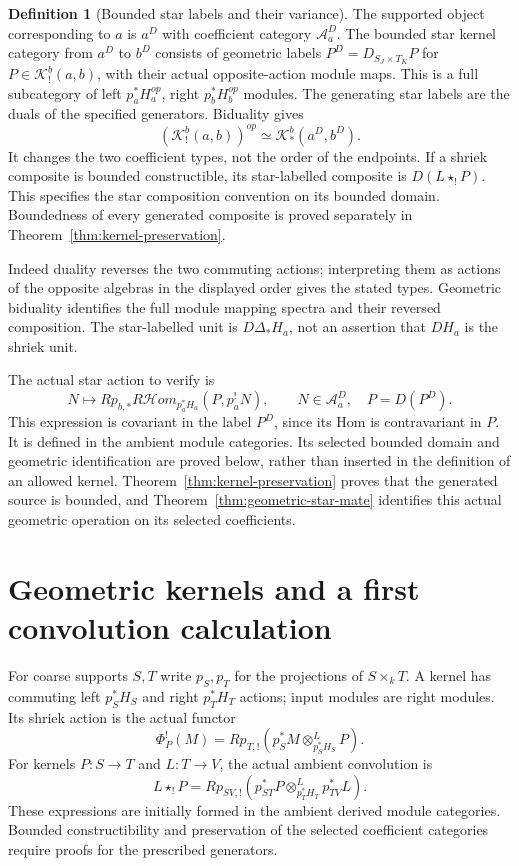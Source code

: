 \documentclass[11pt]{article}
\theoremstyle{definition}
\newtheorem{definition}[proposition]{Definition}
\theoremstyle{remark}
\begin{document}
\begin{definition}[Bounded star labels and their variance]
\label{def:star-kernel-types}
The supported object corresponding to $a$ is $a^D$ with coefficient
category $\mathcal A_a^D$.  The bounded star kernel category from
$a^D$ to $b^D$ consists of geometric labels
$P^D=D_{S_J\times T_K}P$ for $P\in\mathscr K_!^b(a,b)$,
with their actual opposite-action module maps.  This is a full
subcategory of left $p_a^*H_a^{op}$, right $p_b^*H_b^{op}$ modules.
The generating star labels are the duals of the specified generators.
Biduality gives
\[
 (\mathscr K_!^b(a,b))^{op}\simeq
                    \mathscr K_*^b(a^D,b^D).
\]
It changes the two coefficient types, not the order of the endpoints.
If a shriek composite is bounded constructible, its star-labelled
composite is $D(L\star_!P)$.  This specifies the star composition
convention on its bounded domain.  Boundedness of every generated
composite is proved separately in Theorem~\ref{thm:kernel-preservation}.
\end{definition}
Indeed duality reverses the two commuting actions; interpreting them
as actions of the opposite algebras in the displayed order gives the
stated types.  Geometric biduality identifies the full module mapping
spectra and their reversed composition.  The star-labelled unit is
$D\Delta_*H_a$, not an assertion that $D H_a$ is the shriek unit.

The actual star action to verify is
\[
 N\longmapsto Rp_{b,*}R\mathcal Hom_{p_a^*H_a}
              (P,p_a^!N),\qquad N\in\mathcal A_a^D,
 \quad P=D(P^D).
\]
This expression is covariant in the label $P^D$, since its Hom is
contravariant in $P$.  It is defined in the ambient module categories.
Its selected bounded domain and geometric identification are proved
below, rather than inserted in the definition of an allowed kernel.
Theorem~\ref{thm:kernel-preservation} proves that the generated
source is bounded, and Theorem~\ref{thm:geometric-star-mate} identifies
this actual geometric operation on its selected coefficients.

\section{Geometric kernels and a first convolution calculation}
For coarse supports $S,T$ write $p_S,p_T$ for the projections of
$S\times_k T$.  A kernel has commuting left $p_S^*H_S$ and right
$p_T^*H_T$ actions; input modules are right modules.  Its
shriek action is the actual functor
\[
 \Phi_P^!(M)=Rp_{T,!}
       (p_S^*M\otimes^L_{p_S^*H_S}P).
\]
For kernels $P:S\to T$ and $L:T\to V$, the actual ambient convolution is
\[
 L\star_!P=Rp_{SV,!}
  (p_{ST}^*P\otimes^L_{p_T^*H_T}p_{TV}^*L).
\]
These expressions are initially formed in the ambient derived module
categories.  Bounded constructibility and preservation of the selected
coefficient categories require proofs for the prescribed generators.
\end{document}
